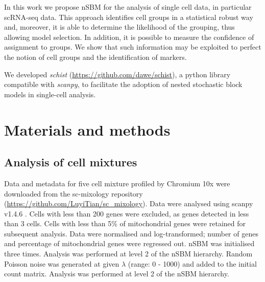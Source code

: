 \documentclass[10pt,letterpaper]{article}
\begin{document}
In this work we propose nSBM for the analysis of single cell data, in particular scRNA-seq data. This approach identifies cell groups in a statistical robust way and, moreover, it is able to determine the likelihood of the grouping, thus allowing model selection. In addition, it is possible to measure the confidence of assignment to groups. We show that such information may be exploited to perfect the notion of cell groups and the identification of markers.

We developed \emph{schist} (\href{https://github.com/dawe/schist}{https:/\slash github.com\slash dawe\slash schist}), a python library compatible with \emph{scanpy}, to facilitate the adoption of nested stochastic block models in single-cell analysis.


\section*{Materials and methods}


\subsection*{Analysis of cell mixtures}

Data and metadata for five cell mixture profiled by Chromium 10x were downloaded from the sc-mixology repository (\href{https://github.com/LuyiTian/sc_mixology}{https:/\slash github.com\slash LuyiTian\slash sc\_mixology}). Data were analysed using scanpy v1.4.6 \cite{wolf_2018}. Cells with less than 200 genes were excluded, as genes detected in less than 3 cells. Cells with less than 5\% of mitochondrial genes were retained for subsequent analysis. Data were normalised and log-transformed; number of genes and percentage of mitochondrial genes were regressed out. nSBM was initialised three times. Analysis was performed at level 2 of the nSBM hierarchy.
Random Poisson noise was generated at given $\lambda$ (range: 0 - 1000) and added to the initial count matrix. Analysis was performed at level 2 of the nSBM hierarchy.
\end{document}

